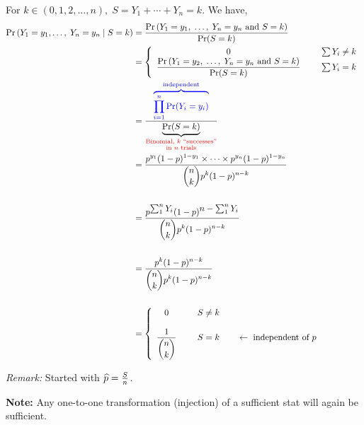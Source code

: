 \newpage\noindent For $k \in (0, 1, 2, \dots, n), \; S = Y_1 + \cdots + Y_n = k$. We have,
\begin{align*}
    \prob{Y_1 = y_1, \dots,\; Y_n = y_n \mid S = k} &= \frac{\prob{Y_1 = y_1, \; \dots, \; Y_n = y_n \text{ and } S = k}}{\Pr(S=k)}\\
    &= \left\{ \begin{array}{cc}
        0 & \hspace{5mm} \sum Y_i \neq k \\
        \displaystyle \frac{\prob{Y_1 = y_2, \; \dots, \; Y_n = y_n \text{ and } S = k}}{\Pr(S=k)} & \hspace{5mm} \sum Y_i = k
        \end{array} \right.\\
     &=  \frac
     {\overbrace{\prod_{i=1}^n \Pr(Y_i=y_i)}^{\color{blue}\text{independent}}}
     {\underbrace{\Pr(S=k)}_
     {\color{red}\substack{\text{Binomial, } k \text{ \say{successes}}\\ \text{in } n \text{ trials}}
     \color{black}}}\\
     &= \frac
     {\displaystyle p^{y_1}(1-p)^{1-y_1} \times \cdots \times p^{y_n}(1-p)^{1-y_n}}
     {\displaystyle  \binom{n}{k}p^k (1-p)^{n-k}}\\\\
     &=  \frac
     {\displaystyle  p^{\textstyle \sum_1^n Y_i}(1-p)^{\textstyle n-\sum_1^n Y_i}}
     {\displaystyle  \binom{n}{k}p^k (1-p)^{n-k}}\\\\
     &= \frac
     {\displaystyle  p^k (1-p)^{n-k}}
     {\displaystyle \binom{n}{k}p^k(1-p)^{n-k}}\\\\
     &= \left\{ \begin{array}{cl}
        0 & \hspace{5mm} S \neq k \\\\
        \displaystyle \dfrac{1}{\displaystyle \binom{n}{k}} & \hspace{5mm} S = k  \qquad \leftarrow \text{ independent of } p
        \end{array} \right.
\end{align*}

\noindent {}

\nl \textit{Remark:} Started with $\widehat{p} = \frac{S}{n}$.

\nnl \textbf{Note:} Any one-to-one transformation (injection) of a sufficient stat will again be sufficient. 

